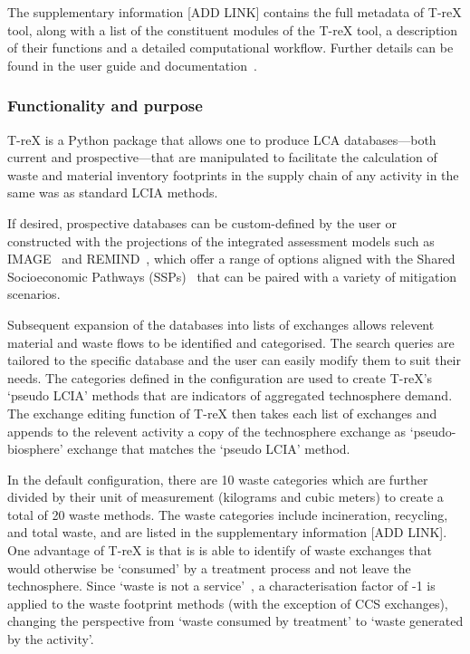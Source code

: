 The supplementary information [ADD LINK] contains the full metadata of T-reX tool, along with a list of the constituent modules of the T-reX tool, a description of their functions and a detailed computational workflow. Further details can be found in the user guide and documentation~\citep{mcdowall2023T-reXdocs}.

\subsubsection{Functionality and purpose}

T-reX is a Python package that allows one to produce LCA databases---both current and prospective---that are manipulated to facilitate the calculation of waste and material inventory footprints in the supply chain of any activity in the same was as standard LCIA methods. 

If desired, prospective databases can be custom-defined by the user or constructed with the projections of the integrated assessment models such as IMAGE~\citep{stehfest2014image} and REMIND~\citep{remind2020model}, which offer a range of options aligned with the Shared Socioeconomic Pathways (SSPs)~\citep{ssp2020ghg} that can be paired with a variety of mitigation scenarios.

Subsequent expansion of the databases into lists of exchanges allows relevent material and waste flows to be identified and categorised. The search queries are tailored to the specific database and the user can easily modify them to suit their needs. The categories defined in the configuration are used to create T-reX's `pseudo LCIA' methods that are indicators of aggregated technosphere demand. The exchange editing function of T-reX then takes each list of exchanges and appends to the relevent activity a copy of the technosphere exchange as `pseudo-biosphere' exchange that matches the `pseudo LCIA' method.

In the default configuration, there are 10 waste categories which are further divided by their unit of measurement (kilograms and cubic meters) to create a total of 20 waste methods. The waste categories include incineration, recycling, and total waste, and are listed in the supplementary information [ADD LINK]. One advantage of T-reX is that is is able to identify of waste exchanges that would otherwise be `consumed' by a treatment process and not leave the technosphere. Since `waste is not a service'~\citep{guinee2021wasteisnotaservice}, a characterisation factor of -1 is applied to the waste footprint methods (with the exception of CCS exchanges), changing the perspective from `waste consumed by treatment' to `waste generated by the activity'.

